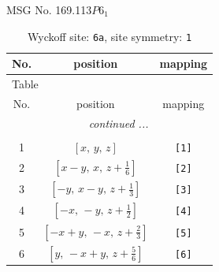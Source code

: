 \documentclass[fleqn,8pt]{jsarticle}
\begin{document}
\setcounter{MaxMatrixCols}{32}

\renewcommand{\tablename}{Table~}
\renewcommand{\figurename}{Figure~}
\begin{center}
\LARGE
MSG No. 169.113\quad$P6_{1}$
\end{center}
\renewcommand{\arraystretch}{1.2}
\begin{longtable}{ccc}
\caption{Wyckoff site: {\tt 6a}, site symmetry: {\tt 1}}
 \\
 \hline \hline
No. & position & mapping \\ \hline \endfirsthead

\multicolumn{2}{l}{\tablename\ \thetable{}} \\
 \hline \hline
No. & position & mapping \\ \hline \endhead

 \hline \hline
\multicolumn{2}{r}{\footnotesize\it continued ...} \\ \endfoot

 \hline \hline
\multicolumn{2}{r}{} \\ \endlastfoot

1 & $\left[ x,\, y,\, z \right]$ & {\tt [1]} \\ \hline
2 & $\left[ x - y,\, x,\, z + \frac{1}{6} \right]$ & {\tt [2]} \\ \hline
3 & $\left[ - y,\, x - y,\, z + \frac{1}{3} \right]$ & {\tt [3]} \\ \hline
4 & $\left[ - x,\, - y,\, z + \frac{1}{2} \right]$ & {\tt [4]} \\ \hline
5 & $\left[ - x + y,\, - x,\, z + \frac{2}{3} \right]$ & {\tt [5]} \\ \hline
6 & $\left[ y,\, - x + y,\, z + \frac{5}{6} \right]$ & {\tt [6]} \\
\end{longtable}
\end{document}
